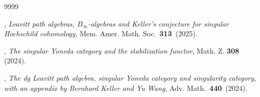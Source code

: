 \documentclass[a4paper, 11pt]{amsart}
\theoremstyle{definition}
\theoremstyle{remark}
\numberwithin{equation}{section}
\begin{document}
\begin{thebibliography}{9999}





, {\em Leavitt path algebras, $B_{\infty}$-algebras and Keller's conjecture for singular Hochschild cohomology}, Mem. Amer. Math. Soc. {\bf 313} (2025). 

, {\em The singular Yoneda category and the stabilization functor}, Math. Z. {\bf 308} (2024).

, {\em The dg Leavitt path algebra, singular Yoneda category and singularity category, with
an appendix by Bernhard Keller and Yu Wang}, Adv. Math. {\bf 440} (2024). 
















\end{thebibliography}
\end{document}
